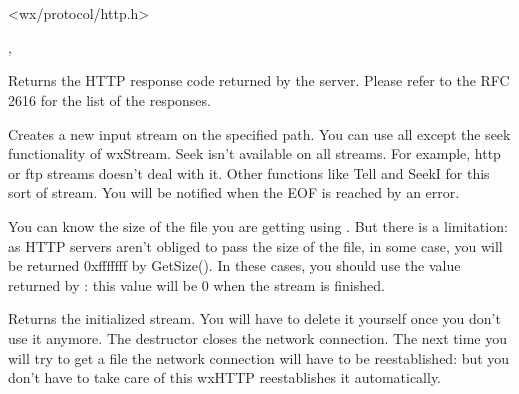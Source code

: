 \section{}\label{wxhttp}




<wx/protocol/http.h>


, 


\label{wxhttpgetresponse}


Returns the HTTP response code returned by the server. Please refer to the RFC
2616 for the list of the responses.


\label{wxhttpgetinputstream}


Creates a new input stream on the specified path. You can use all except the seek
functionality of wxStream. Seek isn't available on all streams. For example,
http or ftp streams doesn't deal with it. Other functions like Tell and SeekI
for this sort of stream.
You will be notified when the EOF is reached by an error.


You can know the size of the file you are getting using .
But there is a limitation: as HTTP servers aren't obliged to pass the size of
the file, in some case, you will be returned 0xfffffff by GetSize(). In these
cases, you should use the value returned by :
this value will be 0 when the stream is finished.


Returns the initialized stream. You will have to delete it yourself once you
don't use it anymore. The destructor closes the network connection.
The next time you will try to get a file the network connection will have
to be reestablished: but you don't have to take care of this wxHTTP reestablishes it automatically.

